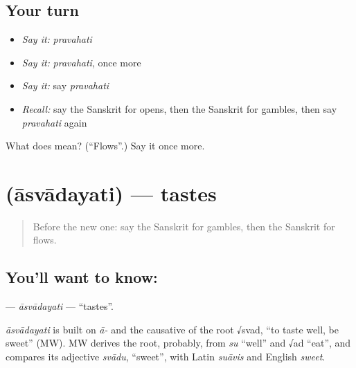 \subsection*{Your turn}
\begin{itemize}
\raggedright
  \item \emph{Say it:} \emph{pravahati}
  \item \emph{Say it:} \emph{pravahati}, once more
  \item \emph{Say it:} say \emph{pravahati}
  \item \emph{Recall:} say the Sanskrit for opens, then the Sanskrit for gambles, then say \emph{pravahati} again
\end{itemize}

\begin{tcolorbox}[breakable,colback=teal!4,colframe=teal!35!black,title={Before you move on}]
What does  mean? (\textquotedblleft{}Flows\textquotedblright{}.) Say it once more.
\end{tcolorbox}
\section[\texorpdfstring{\sk{आस्वादयति} (āsvādayati)}{आस्वादयति (āsvādayati)}]{ (āsvādayati) — tastes}

\label{lesson:SA-C207-asvadayati}



\begin{quote}
Before the new one: say the Sanskrit for gambles, then the Sanskrit for flows.
\end{quote}

\subsection*{You'll want to know: }
\textbf{} — \emph{āsvādayati} — \textquotedblleft{}tastes\textquotedblright{}.

\begin{cousinweb}
\emph{āsvādayati} is built on \emph{ā-} and the causative of the root √svad, \textquotedblleft{}to taste well, be sweet\textquotedblright{} (MW). MW derives the root, probably, from \emph{su} \textquotedblleft{}well\textquotedblright{} and √ad \textquotedblleft{}eat\textquotedblright{}, and compares its adjective \emph{svādu}, \textquotedblleft{}sweet\textquotedblright{}, with Latin \emph{suāvis} and English \emph{sweet}.
\end{cousinweb}

